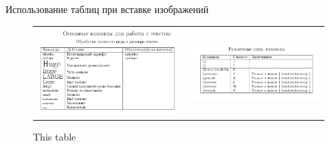 \documentclass{beamer}[aspectratio=169]
\begin{document}
\begin{frame}{Использование таблиц при вставке изображений}
\begin{flushleft}


\begin{figure}[h]
\begin{tabular}[scale=0.6]{cc}
\includegraphics[scale=0.4]{table(1)}
&
\includegraphics[scale=0.3]{table(2)}
\end{tabular}
\caption{This table}
\end{figure}
\end{flushleft}

\end{frame}
\end{document}
